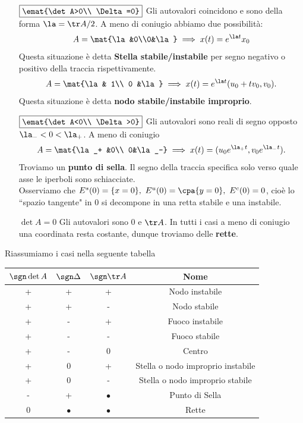 \begin{itemize}
$\star)$ Se $\al=0$ troviamo
\[x(t)=R_{\beta t}(x_0)\]
cio\`e un \textbf{centro}. Osserviamo che $E^c(0)=\R^2$ e $E^s(0)=E^u(0)=\cpa0$.
\item[$\boxed{\emat{\det A>0\\ \Delta=0}}$] Gli autovalori coincidono e sono della forma $\la=\tr A/2$. A meno di coniugio abbiamo due possibilit\`a:
\[A=\mat{\la &0\\0&\la}\implies x(t)=e^{\la t}x_0\]
Questa situazione \`e detta \textbf{Stella stabile/instabile} per segno negativo o positivo della traccia rispettivamente.
\[A=\mat{\la & 1\\ 0 &\la}\implies x(t)=e^{\la t}(u_0+t v_0, v_0).\]
Questa situazione \`e detta \textbf{nodo stabile/instabile improprio}.
\item[$\boxed{\emat{\det A<0\\ \Delta>0}}$] Gli autovalori sono reali di segno opposto $\la_-<0<\la_+$. A meno di coniugio
\[A=\mat{\la_+ &0\\ 0&\la_-}\implies x(t)=(u_0e^{\la_+t},v_0e^{\la_-t}).\]
Troviamo un \textbf{punto di sella}. Il segno della traccia specifica solo verso quale asse le iperboli sono schiacciate.\\
Osserviamo che $E^s(0)=\{x=0\},\ E^u(0)=\cpa{y=0},\ E^c(0)=0$, cio\`e lo ``spazio tangente" in $0$ si decompone in una retta stabile e una instabile.
\item[$\boxed{\det A=0}$] Gli autovalori sono $0$ e $\tr A$. In tutti i casi a meno di coniugio una coordinata resta costante, dunque troviamo delle \textbf{rette}.
\end{itemize}

\noindent Riassumiamo i casi nella seguente tabella
\begin{center}
\begin{tabular}{|c|c|c||c|}
\hline
$\sgn\det A$ & $\sgn \Delta$ & $\sgn \tr A$ & Nome\\\hline\hline
+ & + & + & Nodo instabile \\\hline
+ & + & - & Nodo stabile \\\hline
+ & - & + & Fuoco instabile \\\hline
+ & - & - & Fuoco stabile \\\hline
+ & - & 0 & Centro \\\hline
+ & 0 & + & Stella o nodo improprio instabile \\\hline
+ & 0 & - & Stella o nodo improprio stabile \\\hline
- & + & $\bullet$ & Punto di Sella \\\hline
0 & $\bullet$ & $\bullet$ & Rette \\\hline
\end{tabular}
\end{center}

